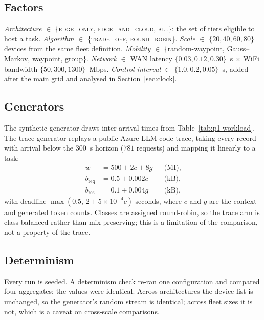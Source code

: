 \documentclass[journal,10pt]{IEEEtran}
\begin{document}
\subsection{Factors}
\emph{Architecture} $\in$ \{\textsc{edge\_only}, \textsc{edge\_and\_cloud},
\textsc{all}\}: the set of tiers eligible to host a task.
\emph{Algorithm} $\in$ \{\textsc{trade\_off}, \textsc{round\_robin}\}.
\emph{Scale} $\in$ $\{20,40,60,80\}$ devices from the same fleet definition.
\emph{Mobility} $\in$ \{random-waypoint, Gauss--Markov, waypoint, group\}.
\emph{Network} $\in$ WAN latency $\{0.03,0.12,0.30\}$~s $\times$ WiFi bandwidth
$\{50,300,1300\}$~Mbps.
\emph{Control interval} $\in$ $\{1.0, 0.2, 0.05\}$~s, added after the main grid
and analysed in Section~\ref{sec:clock}.

\subsection{Generators}
The synthetic generator draws inter-arrival times from
Table~\ref{tab:p1-workload}. The trace generator replays a public Azure LLM code
trace, taking every record with arrival below the $300$~s horizon ($781$
requests) and mapping it linearly to a task:
\begin{equation}
\begin{aligned}
w &= 500+2c+8g &&\text{(MI)},\\
b_{\text{req}} &= 0.5+0.002c &&\text{(kB)},\\
b_{\text{res}} &= 0.1+0.004g &&\text{(kB)},
\end{aligned}
\label{eq:trace}
\end{equation}
with deadline $\max(0.5,\,2+5\times10^{-4}c)$ seconds, where $c$ and $g$ are the
context and generated token counts. Classes are assigned round-robin, so the
trace arm is class-balanced rather than mix-preserving; this is a limitation of
the comparison, not a property of the trace.

\subsection{Determinism}
Every run is seeded. A determinism check re-ran one configuration and compared
four aggregates; the values were identical. Across architectures the device list
is unchanged, so the generator's random stream is identical; across fleet sizes
it is not, which is a caveat on cross-scale comparisons.

\end{document}
